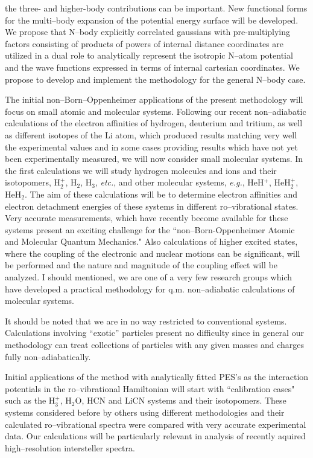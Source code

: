 the three- and higher-body contributions can be important.
New functional forms for the multi--body expansion of the potential
energy
surface  
will be developed.
We propose that N--body
explicitly correlated gaussians with pre-multiplying factors consisting
of
products of powers of internal distance coordinates are utilized in a
dual
role to analytically represent the isotropic N--atom potential and the
wave functions expressed in terms of internal cartesian coordinates.
We propose to develop and implement the methodology for the general
N--body case.

The initial non--Born--Oppenheimer
applications of the present methodology
will focus on
small atomic and molecular systems.
Following our recent non--adiabatic calculations
of the electron affinities of hydrogen, deuterium and tritium,
as well as different isotopes of the Li atom,
which produced results matching very well the experimental
values and in some cases providing results which have not 
yet been experimentally measured, we will now
consider small molecular systems.
In the first calculations
we will study
hydrogen molecules and ions and their isotopomers,
H$_2^+$, H$_2$, H$_3$, {\it etc.},
and other molecular systems, {\it e.g.}, HeH$^+$, HeH$_2^+$, HeH$_2$.
The aim of these calculations will be to determine
electron affinities and electron detachment energies
of these systems in different ro--vibrational states.
Very accurate measurements, which have
recently become
available
for these systems
present an exciting challenge for
the ``non--Born-Oppenheimer Atomic and Molecular Quantum Mechanics."
Also calculations of
higher excited states,
where the coupling of the electronic and nuclear motions
can be significant,
will be performed and the nature and magnitude of the
coupling effect will be
analyzed. I should mentioned, we are one of a very few research
groups which have developed a practical methodology for
q.m. non--adiabatic calculations of molecular systems.

It should be noted that we are in no way restricted to conventional
systems.
Calculations involving ``exotic'' particles present no difficulty
since in general our methodology can treat collections of particles
with any given masses and charges fully non--adiabatically.

Initial applications of the method with
analytically fitted PES's as the
interaction potentials
in the ro--vibrational Hamiltonian
will start with
``calibration cases"
such as the H$_3^+$, H$_2$O, HCN and LiCN systems and their
isotopomers.
These systems considered before by others
using different methodologies
and their calculated ro--vibrational spectra
were compared with very accurate experimental data.
Our calculations will be particularly relevant
in analysis of
recently aquired high--resolution
intersteller spectra.


